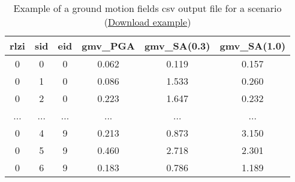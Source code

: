 \begin{table}[htbp]
\centering
\begin{tabular}{cccccc}

\hline
\rowcolor{lightgray}
\textbf{rlzi} & \textbf{sid} & \textbf{eid} & \textbf{gmv\_PGA} & \textbf{gmv\_SA(0.3)} & \textbf{gmv\_SA(1.0)} \\
\hline
0 & 0 & 0 & 0.062 & 0.119 & 0.157 \\
0 & 1 & 0 & 0.086 & 1.533 & 0.260 \\
0 & 2 & 0 & 0.223 & 1.647 & 0.232 \\
... & ... & ... & ... & ... & ... \\
0 & 4 & 9 & 0.213 & 0.873 & 3.150 \\
0 & 5 & 9 & 0.460 & 2.718 & 2.301 \\
0 & 6 & 9 & 0.183 & 0.786 & 1.189
\hline

\end{tabular}
\caption{Example of a ground motion fields csv output file for a scenario (\href{https://raw.githubusercontent.com/gem/oq-engine/master/doc/manual/oqum/hazard/verbatim/output_scenario_gmfs.csv}{Download example})}
\label{output:gmf_scenario}
\end{table}